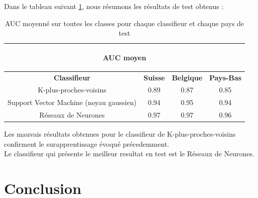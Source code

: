 \documentclass{book}
\begin{document}
Dans le tableau suivant \ref{resultats}, nous résumons les résultats de test obtenus :

 \begin{table}
    \begin{center}
    \begin{adjustbox}{max width=\textwidth}
    {\scriptsize
    \begin{tabular}{|c|c|c|c|}
      \hline
      \multicolumn{4}{|c|}{\begin{bf} AUC moyen\end{bf}} \\
      \hline
      \textbf{Classifieur} & \textbf{Suisse} & \textbf{Belgique} & \textbf{Pays-Bas}\\
      \hline
      K-plus-proches-voisins & 0.89 & 0.87 & 0.85\\
      \hline
      Support Vector Machine (noyau gaussien) & 0.94 & 0.95 & 0.94\\
      \hline
      Réseaux de Neurones & 0.97 & 0.97 & 0.96\\
      \hline
    \end{tabular}
    }
    \end{adjustbox}
    \label{resultats}
    \caption{AUC moyenné sur toutes les classes pour chaque classifieur et chaque pays de test}
    \end{center}
  \end{table}
  
 Les mauvais résultats obtenues pour le classifieur  de K-plus-proches-voisins confirment le surapprentissage 
 évoqué précedemment.\\
 Le classifieur qui présente le meilleur resultat en test est le Réseaux de Neurones.
  
  
\chapter{Conclusion}
\end{document}
